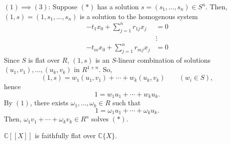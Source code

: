$(1)\implies (3)$: Suppose $(*)$ has a solution $s=(s_1, \dots, s_n)\in S^n$.  Then, $(1, s)= (1, s_1, \dots, s_n)$ is a solution to the homogenous system
\begin{align*} -t_1x_0+\sum_{j=1}^n r_{1j}x_j &=  0  \\
				&\vdots     \tag{$**$} \\
		-t_mx_0 + \sum_{j=1}^n r_{mj}x_j  & =  0 \end{align*}
Since $S$ is flat over $R$, $(1, s)$ is an $S$-linear combination of solutions $(u_1, v_1), \dots, (u_k, v_k)$ in $R^{1+n}$. So,
$$(1, s) = w_1(u_1, v_1) + \cdots + w_k(u_k, v_k) \qquad (w_i\in S),$$
hence
$$1= w_1 u_1 + \cdots + w_k u_k.$$
By $(1)$, there exists $\omega_1, \dots, \omega_k\in R$ such that
$$1= \omega_1u_1 + \cdots + \omega_k u_k.$$
Then, $\omega_1v_1+\cdots + \omega_k v_k\in R^n$ solves $(*)$. 



\begin{theorem} $\mathds{C}[[X]]$ is faithfully flat over $\mathds{C}\{X\}$. \end{theorem}

